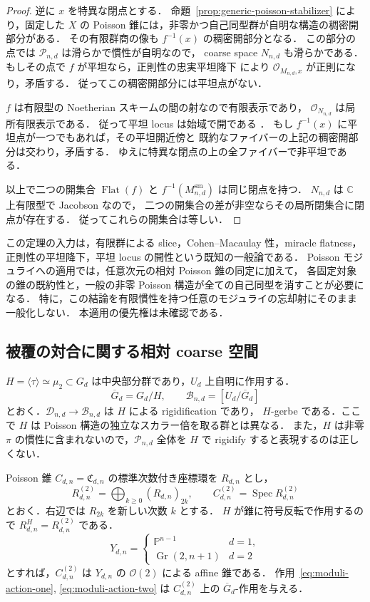 \begin{proof}
逆に $x$ を特異な閉点とする．
命題~\ref{prop:generic-poisson-stabilizer} により，固定した $X$ の
Poisson 錐には，非零かつ自己同型群が自明な構造の稠密開部分がある．
その有限群商の像も $f^{-1}(x)$ の稠密開部分となる．
この部分の点では $\mathcal P_{n,d}$ は滑らかで慣性が自明なので，
coarse space $N_{n,d}$ も滑らかである．
もしその点で $f$ が平坦なら，正則性の忠実平坦降下
\cite[Tag 07NG]{StacksProject} により $\mathcal O_{M_{n,d},x}$ が正則になり，矛盾する．
従ってこの稠密開部分には平坦点がない．

$f$ は有限型の Noetherian スキームの間の射なので有限表示であり，
$\mathcal O_{N_{n,d}}$ は局所有限表示である．
従って平坦 locus は始域で開である
\cite[Tag 0399]{StacksProject}．
もし $f^{-1}(x)$ に平坦点が一つでもあれば，その平坦開近傍と
既約なファイバーの上記の稠密開部分は交わり，矛盾する．
ゆえに特異な閉点の上の全ファイバーで非平坦である．

以上で二つの開集合 $\operatorname{Flat}(f)$ と
$f^{-1}(M_{n,d}^{\mathrm{sm}})$ は同じ閉点を持つ．
$N_{n,d}$ は $\mathbb C$ 上有限型で Jacobson なので，
二つの開集合の差が非空ならその局所閉集合に閉点が存在する．
従ってこれらの開集合は等しい．
\end{proof}

\begin{remark}[標準的な局所理論と本研究への適用]
この定理の入力は，有限群による slice，Cohen--Macaulay 性，miracle flatness，
正則性の平坦降下，平坦 locus の開性という既知の一般論である．
Poisson モジュライへの適用では，任意次元の相対 Poisson 錐の同定に加えて，
各固定対象の錐の既約性と，一般の非零 Poisson 構造が全ての自己同型を消すことが必要になる．
特に，この結論を有限慣性を持つ任意のモジュライの忘却射にそのまま一般化しない．
本適用の優先権は未確認である．
\end{remark}

\subsection{被覆の対合に関する相対 coarse 空間}

$H=\langle\tau\rangle\simeq\mu_2\subset G_d$ は中央部分群であり，$U_d$ 上自明に作用する．
\[
 \overline G_d=G_d/H,\qquad
 \mathcal B_{n,d}=[U_d/\overline G_d]
\]
とおく．$\mathcal D_{n,d}\to\mathcal B_{n,d}$ は $H$ による rigidification であり，
$H$-gerbe である．ここで $H$ は Poisson 構造の独立なスカラー倍を取る群とは異なる．
また，$H$ は非零 $\pi$ の慣性に含まれないので，$\mathcal P_{n,d}$ 全体を
$H$ で rigidify すると表現するのは正しくない．

Poisson 錐 $C_{d,n}=\mathfrak C_{d,n}$ の標準次数付き座標環を $R_{d,n}$ とし，
\[
 R_{d,n}^{(2)}=\bigoplus_{k\geq0}(R_{d,n})_{2k},\qquad
 C_{d,n}^{(2)}=\operatorname{Spec}R_{d,n}^{(2)}
\]
とおく．右辺では $R_{2k}$ を新しい次数 $k$ とする．
$H$ が錐に符号反転で作用するので $R_{d,n}^{H}=R_{d,n}^{(2)}$ である．
\[
 Y_{d,n}=\begin{cases}\mathbb P^{n-1}&d=1,\\
 \operatorname{Gr}(2,n+1)&d=2
 \end{cases}
\]
とすれば，$C_{d,n}^{(2)}$ は $Y_{d,n}$ の $\mathcal O(2)$ による affine 錐である．
作用~\eqref{eq:moduli-action-one}, \eqref{eq:moduli-action-two} は
$C_{d,n}^{(2)}$ 上の $\overline G_d$-作用を与える．


